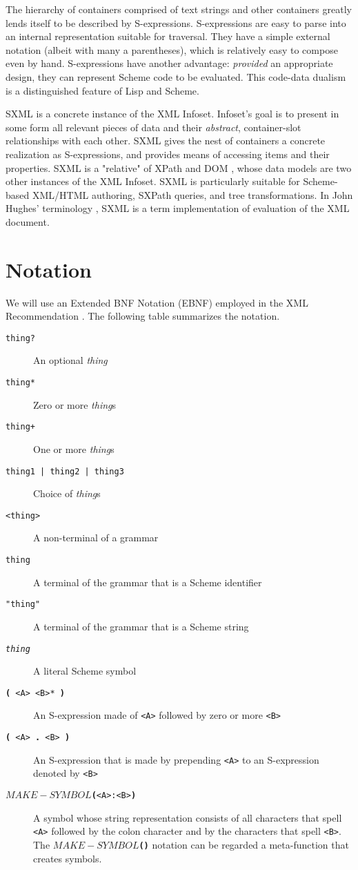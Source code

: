 \documentclass[10pt]{article}
\begin{document}
The hierarchy of containers comprised of text strings and other
containers greatly lends itself to be described by
S-expressions. S-expressions \cite{McCarthy} are easy to parse into an internal
representation suitable for traversal.  They have a simple external
notation (albeit with many a parentheses), which is relatively easy to
compose even by hand.  S-expressions have another advantage: \emph{provided} an appropriate design, they can represent Scheme code to be evaluated.
 This code-data dualism is a distinguished feature of Lisp and Scheme. 

SXML is a concrete instance of the XML Infoset. Infoset's goal is
to present in some form all relevant pieces of data and their \emph{abstract}, container-slot relationships with each other.  SXML
gives the nest of containers a concrete realization as S-expressions,
and provides means of accessing items and their properties. SXML is a
"relative" of XPath \cite{XPath} and DOM \cite{DOM},
whose data models are two other instances of the XML Infoset. SXML is
particularly suitable for Scheme-based XML/HTML authoring, SXPath
queries, and tree transformations. In John Hughes' terminology \cite{Hughes-PP}, SXML is a term implementation of evaluation of the XML
document.

\section{Notation}
We will use an Extended BNF Notation (EBNF) employed in the XML
Recommendation \cite{XML}. The following table summarizes the notation.

\begin{description}
\item [\texttt{thing?}] An optional \emph{thing}
\item [\texttt{thing*}] Zero or more \emph{thing}s
\item [\texttt{thing+}] One or more \emph{thing}s
\item [\texttt{thing1 | thing2 | thing3}] Choice of \emph{thing}s
\item [\texttt{<thing>}] A non-terminal of a grammar
\item [\texttt{thing}] A terminal of the grammar that is a Scheme identifier
\item [\texttt{"thing"}] A terminal of the grammar that is a Scheme string
\item [\texttt{{\itshape thing}}] A literal Scheme symbol
\item [\texttt{\textbf{(} <A> <B>* \textbf{)}}] An S-expression made of \texttt{<A>} followed by zero or more \texttt{<B>}
\item [\texttt{\textbf{(} <A>\textbf{ . }<B> \textbf{)}}] An S-expression that is made by prepending \texttt{<A>} to an S-expression denoted by \texttt{<B>}
\item [\texttt{\textbf{$MAKE{-}SYMBOL$(}<A>:<B>\textbf{)}}] A symbol whose string representation consists of all
characters that spell \texttt{<A>} followed by the colon character and by the characters that spell \texttt{<B>}. The \texttt{\textbf{$MAKE{-}SYMBOL$(}\textbf{)}} notation can be regarded a meta-function that creates symbols.
\end{description}
\end{document}
